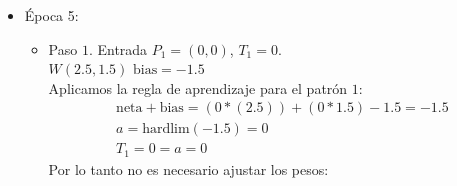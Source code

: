 \documentclass{article}
\begin{document}
{{\begin{itemize}
\begin{itemize}
\item Paso $3$. Entrada $P_3 = (1, 0)$, $T_3 = 0$. \\
$W(1.5, 0.5)$  $\text{bias} = -2.5$ \\

Aplicamos la regla de aprendizaje para el patrón $3$:
\begin{align*}
&\text{neta} + \text{bias}= (1 * (1.5)) + (0 * 0.5) - 1.5 = -2.5\\
&a = \text{hardlim}(-2.5) = 0 \\
&T_3 = 0 = a = 0
\end{align*}
Por lo tanto no es necesario ajustar los pesos:

\item Paso $4$. Entrada $P_4 = (1, 1)$, $T_4 = 1$. \\
$W(1.5, 0.5)$  $\text{bias} = -2.5$ \\

Aplicamos la regla de aprendizaje para el patrón $4$:
\begin{align*}
&\text{neta} + \text{bias}= (1 * (1.5)) + (1 * 0.5) - 2.5 = -0.5\\
&a = \text{hardlim}(-0.5) = 0 \\
&T_4 = 1 \neq a = 0
\end{align*}
Por lo tanto es necesario ajustar los pesos:
\begin{align*}
&e = T_4 - a = 1- 0 =  1, \\
&W_n = W + e* P_4 = (1.5, 0.5) + (1) * (1,1) = (2.5, 1.5) \\
&\text{bias}_N = \text{bias} + e = -2.5 + 1 = -1.5
\end{align*}
\end{itemize}

\item Época 5:
\begin{itemize}
\item Paso $1$. Entrada $P_1 = (0, 0)$, $T_1= 0$. \\
$W(2.5, 1.5)$  $\text{bias} = -1.5$ \\

Aplicamos la regla de aprendizaje para el patrón $1$:
\begin{align*}
&\text{neta} + \text{bias}= (0 * (2.5)) + (0 * 1.5) - 1.5 = -1.5\\
&a = \text{hardlim}(-1.5) = 0 \\
&T_1 = 0 = a = 0
\end{align*}
Por lo tanto no es necesario ajustar los pesos:



\end{itemize}
\end{itemize}}}
\end{document}
